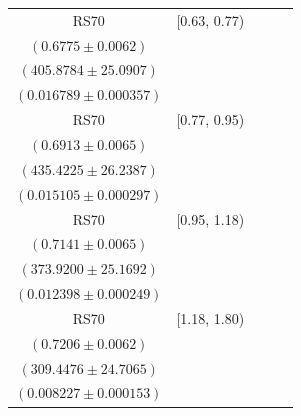 {\begin{longtable}{|c|c|c|c|c|}
RS70 & [0.63, 0.77) & \begin{tabular}{@{}c@{}}$0.6986 \pm 0.0085$ \\ $(0.6775 \pm 0.0062)$\end{tabular} & \begin{tabular}{@{}c@{}}$393.6253 \pm 24.3332$ \\ $(405.8784 \pm 25.0907)$\end{tabular} & \begin{tabular}{@{}c@{}}$0.015614 \pm 0.000644$ \\ $(0.016789 \pm 0.000357)$\end{tabular} \\ \hline
RS70 & [0.77, 0.95) & \begin{tabular}{@{}c@{}}$0.6990 \pm 0.0086$ \\ $(0.6913 \pm 0.0065)$\end{tabular} & \begin{tabular}{@{}c@{}}$430.6447 \pm 25.9508$ \\ $(435.4225 \pm 26.2387)$\end{tabular} & \begin{tabular}{@{}c@{}}$0.014777 \pm 0.000551$ \\ $(0.015105 \pm 0.000297)$\end{tabular} \\ \hline
RS70 & [0.95, 1.18) & \begin{tabular}{@{}c@{}}$0.6950 \pm 0.0095$ \\ $(0.7141 \pm 0.0065)$\end{tabular} & \begin{tabular}{@{}c@{}}$384.1995 \pm 25.8611$ \\ $(373.9200 \pm 25.1692)$\end{tabular} & \begin{tabular}{@{}c@{}}$0.012866 \pm 0.000475$ \\ $(0.012398 \pm 0.000249)$\end{tabular} \\ \hline
RS70 & [1.18, 1.80) & \begin{tabular}{@{}c@{}}$0.6624 \pm 0.0110$ \\ $(0.7206 \pm 0.0062)$\end{tabular} & \begin{tabular}{@{}c@{}}$336.6620 \pm 26.8794$ \\ $(309.4476 \pm 24.7065)$\end{tabular} & \begin{tabular}{@{}c@{}}$0.008346 \pm 0.000287$ \\ $(0.008227 \pm 0.000153)$\end{tabular} \\ \hline
\end{longtable}
}

